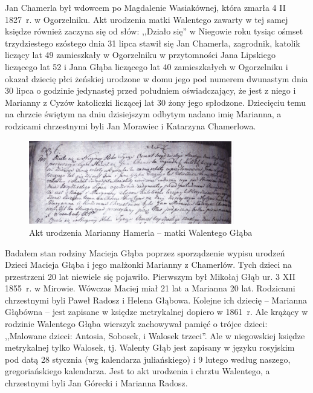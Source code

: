 Jan Chamerla był wdowcem po Magdalenie Wasiakównej, która zmarła 4 II 1827~r. w Ogorzelniku.
Akt urodzenia matki Walentego zawarty w tej samej księdze również zaczyna się od słów: ,,Działo się'' w Niegowie roku tysiąc ośmset trzydziestego szóstego dnia 31 lipca stawił się Jan Chamerla, zagrodnik, katolik liczący lat 49 zamieszkały w Ogorzelniku w przytomności Jana Lipskiego liczącego lat 52 i Jana Głąba liczącego lat 40 zamieszkałych w Ogorzelniku i okazał dziecię płci żeńskiej urodzone w domu jego pod numerem dwunastym dnia 30 lipca o godzinie jedynastej przed południem oświadczający, że jest z niego i Marianny z Cyzów katoliczki liczącej lat 30 żony jego spłodzone. Dziecięciu temu na chrzcie świętym na dniu dzisiejszym odbytym nadano imię Marianna, a rodzicami chrzestnymi byli Jan Morawiec i Katarzyna Chamerlowa.

\begin{figure}[!h]
\begin{center}
\includegraphics[width=0.8\textwidth]{zdjecia/akt_urodzenia_marianny_hamerla.jpg}
\caption[Akt urodzenia Marianny Hamerla]{Akt urodzenia Marianny Hamerla -- matki Walentego Głąba}
\label{rys:akt_urodzenia_marianny_hamerla}
\end{center}
\end{figure}

Badałem stan rodziny Macieja Głąba poprzez sporządzenie wypisu urodzeń Dzieci Macieja Głąba i jego małżonki Marianny z Chamerlów. Tych dzieci na przestrzeni 20 lat niewiele się pojawiło. Pierwszym był Mikołaj Głąb ur. 3 XII 1855~r. w Mirowie. Wówczas Maciej miał 21 lat a Marianna 20 lat. Rodzicami chrzestnymi byli Paweł Radosz i Helena Głąbowa. Kolejne ich dziecię -- Marianna Głąbówna -- jest zapisane w księdze metrykalnej dopiero w 1861~r. Ale krążący w rodzinie Walentego Głąba wierszyk zachowywał pamięć o trójce dzieci: ,,Malowane dzieci: Antosia, Sobosek, i Walosek trzeci''. Ale w niegowskiej księdze metrykalnej tylko Walosek, tj. Walenty Głąb jest zapisany w języku rosyjskim pod datą 28 stycznia (wg kalendarza juliańskiego) i 9 lutego według naszego, gregoriańskiego kalendarza. Jest to akt urodzenia i chrztu Walentego, a chrzestnymi byli Jan Górecki i Marianna Radosz.


